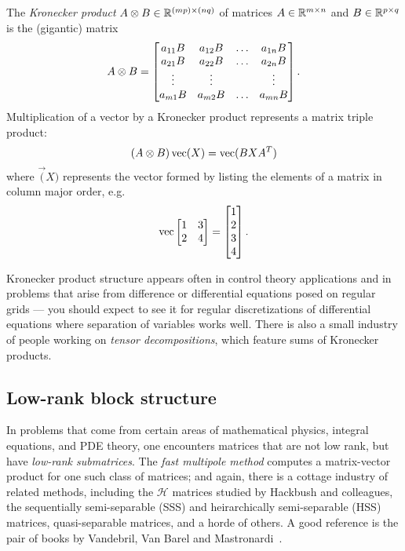 \documentclass[12pt, leqno]{article} %
\begin{document}
The {\em Kronecker product} $A \kron B \in \bbR^{(mp) \times (nq)}$
of matrices $A \in \bbR^{m \times n}$ and $B \in \bbR^{p \times q}$
is the (gigantic) matrix
\[
  A \kron B =
  \begin{bmatrix}
    a_{11} B & a_{12} B & \ldots & a_{1n} B \\
    a_{21} B & a_{22} B & \ldots & a_{2n} B \\
    \vdots & \vdots & & \vdots \\
    a_{m1} B & a_{m2} B & \ldots & a_{mn} B
  \end{bmatrix}.
\]
Multiplication of a vector by a Kronecker product represents
a matrix triple product:
\[
  (A \kron B) \vec(X) = \vec(BXA^T)
\]
where $\vec(X)$ represents the vector formed by listing the
elements of a matrix in column major order, e.g.
\[
  \vec \begin{bmatrix} 1 & 3 \\ 2 & 4 \end{bmatrix} =
  \begin{bmatrix} 1 \\ 2 \\ 3 \\ 4 \end{bmatrix}.
\]

Kronecker product structure appears often in control theory
applications and in problems that arise from difference or
differential equations posed on regular grids --- you should
expect to see it for regular discretizations of differential
equations where separation of variables works well.  There is
also a small industry of people working on {\em tensor decompositions},
which feature sums of Kronecker products.

\subsection{Low-rank block structure}

In problems that come from certain areas of mathematical physics,
integral equations, and PDE theory, one encounters matrices that are not
low rank, but have  {\em low-rank submatrices}.  The {\em fast multipole
method} computes a matrix-vector product for one such class of matrices;
and again, there is a cottage industry of related methods, including
the $\mathcal{H}$ matrices studied by Hackbush and colleagues, the
sequentially semi-separable (SSS) and heirarchically
semi-separable (HSS) matrices, quasi-separable matrices, and a horde of
others.  A good reference is the pair of books by Vandebril, Van Barel
and Mastronardi~\cite{Vandebril:2010:Linear,Vandebril:2010:Eigen}.



\end{document}
